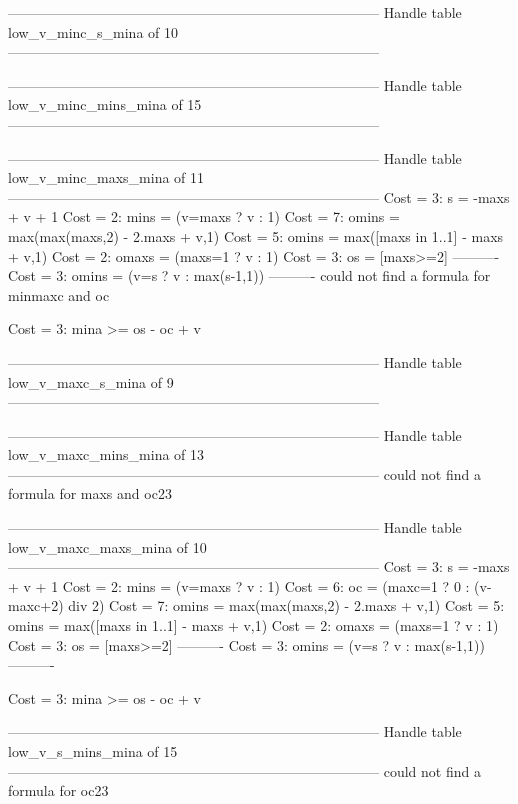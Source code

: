 --------------------------------------------------------------------------------
Handle table low_v_minc_s_mina of 10
--------------------------------------------------------------------------------


--------------------------------------------------------------------------------
Handle table low_v_minc_mins_mina of 15
--------------------------------------------------------------------------------


--------------------------------------------------------------------------------
Handle table low_v_minc_maxs_mina of 11
--------------------------------------------------------------------------------
Cost =  3:  s       = -maxs + v + 1
Cost =  2:  mins    = (v=maxs ? v : 1)
Cost =  7:  omins   = max(max(maxs,2) - 2.maxs + v,1)
Cost =  5:  omins   = max([maxs in 1..1] - maxs + v,1)
Cost =  2:  omaxs   = (maxs=1 ? v : 1)
Cost =  3:  os      = [maxs>=2]
----------
Cost =  3:  omins   = (v=s ? v : max(s-1,1))
----------
could not find a formula for minmaxc and oc

Cost =  3:  mina >= os - oc + v

--------------------------------------------------------------------------------
Handle table low_v_maxc_s_mina of 9
--------------------------------------------------------------------------------


--------------------------------------------------------------------------------
Handle table low_v_maxc_mins_mina of 13
--------------------------------------------------------------------------------
could not find a formula for maxs and oc23


--------------------------------------------------------------------------------
Handle table low_v_maxc_maxs_mina of 10
--------------------------------------------------------------------------------
Cost =  3:  s     = -maxs + v + 1
Cost =  2:  mins  = (v=maxs ? v : 1)
Cost =  6:  oc    = (maxc=1 ? 0 : (v-maxc+2) div 2)
Cost =  7:  omins = max(max(maxs,2) - 2.maxs + v,1)
Cost =  5:  omins = max([maxs in 1..1] - maxs + v,1)
Cost =  2:  omaxs = (maxs=1 ? v : 1)
Cost =  3:  os    = [maxs>=2]
----------
Cost =  3:  omins = (v=s ? v : max(s-1,1))
----------

Cost =  3:  mina >= os - oc + v

--------------------------------------------------------------------------------
Handle table low_v_s_mins_mina of 15
--------------------------------------------------------------------------------
could not find a formula for oc23

